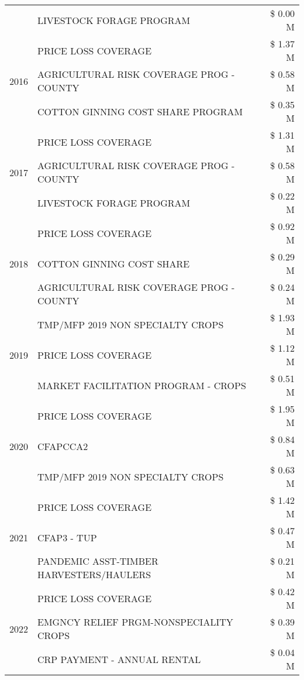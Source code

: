 \begin{tabular}{llr}
 & LIVESTOCK FORAGE PROGRAM & \$ 0.00 M \\
\cline{1-3}
\multirow[t]{3}{*}{2016} & PRICE LOSS COVERAGE & \$ 1.37 M \\
 & AGRICULTURAL RISK COVERAGE PROG - COUNTY & \$ 0.58 M \\
 & COTTON GINNING COST SHARE PROGRAM & \$ 0.35 M \\
\cline{1-3}
\multirow[t]{3}{*}{2017} & PRICE LOSS COVERAGE & \$ 1.31 M \\
 & AGRICULTURAL RISK COVERAGE PROG - COUNTY & \$ 0.58 M \\
 & LIVESTOCK FORAGE PROGRAM & \$ 0.22 M \\
\cline{1-3}
\multirow[t]{3}{*}{2018} & PRICE LOSS COVERAGE & \$ 0.92 M \\
 & COTTON GINNING COST SHARE & \$ 0.29 M \\
 & AGRICULTURAL RISK COVERAGE PROG - COUNTY & \$ 0.24 M \\
\cline{1-3}
\multirow[t]{3}{*}{2019} & TMP/MFP 2019 NON SPECIALTY CROPS & \$ 1.93 M \\
 & PRICE LOSS COVERAGE & \$ 1.12 M \\
 & MARKET FACILITATION PROGRAM - CROPS & \$ 0.51 M \\
\cline{1-3}
\multirow[t]{3}{*}{2020} & PRICE LOSS COVERAGE & \$ 1.95 M \\
 & CFAPCCA2 & \$ 0.84 M \\
 & TMP/MFP 2019 NON SPECIALTY CROPS & \$ 0.63 M \\
\cline{1-3}
\multirow[t]{3}{*}{2021} & PRICE LOSS COVERAGE & \$ 1.42 M \\
 & CFAP3 - TUP & \$ 0.47 M \\
 & PANDEMIC ASST-TIMBER HARVESTERS/HAULERS & \$ 0.21 M \\
\cline{1-3}
\multirow[t]{3}{*}{2022} & PRICE LOSS COVERAGE & \$ 0.42 M \\
 & EMGNCY RELIEF PRGM-NONSPECIALITY CROPS & \$ 0.39 M \\
 & CRP PAYMENT - ANNUAL RENTAL & \$ 0.04 M \\
\cline{1-3}
\bottomrule
\end{tabular}
